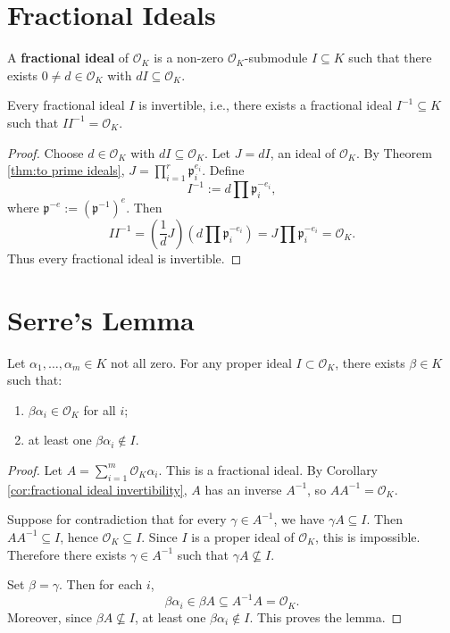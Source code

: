 \section{Fractional Ideals}

\begin{defn}
A \textbf{fractional ideal} of \(\mathcal{O}_K\) is a non-zero \(\mathcal{O}_K\)-submodule \(I \subseteq K\) such that there exists \(0 \neq d \in \mathcal{O}_K\) with \(d I \subseteq \mathcal{O}_K\).
\end{defn}

\begin{cor}\label{cor:fractional ideal invertibility}
Every fractional ideal \(I\) is invertible, i.e., there exists a fractional ideal \(I^{-1} \subseteq K\) such that \(I I^{-1} = \mathcal{O}_K\).
\end{cor}

\begin{proof}
Choose \(d \in \mathcal{O}_K\) with \(d I \subseteq \mathcal{O}_K\). Let \(J = d I\), an ideal of \(\mathcal{O}_K\). By Theorem \ref{thm:to prime ideals}, \(J = \prod_{i=1}^r \mathfrak{p}_i^{e_i}\). Define
\[
I^{-1} := d \prod \mathfrak{p}_i^{-e_i},
\]
where \(\mathfrak{p}^{-e} := (\mathfrak{p}^{-1})^e\). Then
\[
I I^{-1} = \left( \frac{1}{d} J \right) \left( d \prod \mathfrak{p}_i^{-e_i} \right)
= J \prod \mathfrak{p}_i^{-e_i}
= \mathcal{O}_K.
\]
Thus every fractional ideal is invertible.
\end{proof}

\section{Serre's Lemma }

\begin{lemma}[Serre]\label{lem:Serre}
Let \(\alpha_1, \dots, \alpha_m \in K\) not all zero. For any proper ideal \(I \subset \mathcal{O}_K\), there exists \(\beta \in K\) such that:
\begin{enumerate}
    \item \(\beta \alpha_i \in \mathcal{O}_K\) for all \(i\);
    \item at least one \(\beta \alpha_i \notin I\).
\end{enumerate}
\end{lemma}
\begin{proof}
Let \(A = \sum_{i=1}^m \mathcal{O}_K \alpha_i\). This is a fractional ideal. By Corollary \ref{cor:fractional ideal invertibility}, \(A\) has an inverse \(A^{-1}\), so \(A A^{-1} = \mathcal{O}_K\).

Suppose for contradiction that for every \(\gamma \in A^{-1}\), we have \(\gamma A \subseteq I\). Then \(A A^{-1} \subseteq I\), hence \(\mathcal{O}_K \subseteq I\). Since \(I\) is a proper ideal of \(\mathcal{O}_K\), this is impossible. Therefore there exists \(\gamma \in A^{-1}\) such that \(\gamma A \not\subseteq I\).

Set \(\beta = \gamma\). Then for each \(i\),
\[
\beta \alpha_i \in \beta A \subseteq A^{-1} A = \mathcal{O}_K.
\]
Moreover, since \(\beta A \not\subseteq I\), at least one \(\beta \alpha_i \notin I\). This proves the lemma.
\end{proof}

